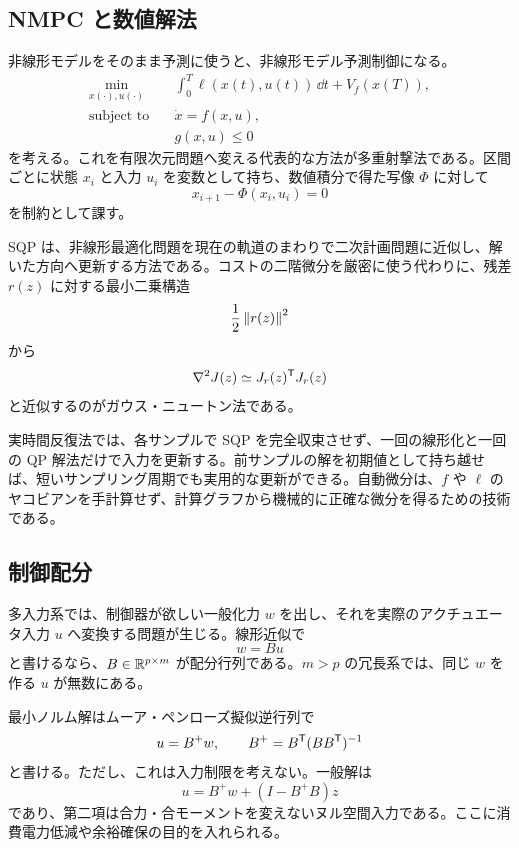 \subsection{NMPC と数値解法}

非線形モデルをそのまま予測に使うと、非線形モデル予測制御になる。
\begin{align}
  \min_{x(\cdot),u(\cdot)}\quad &
  \int_0^T \ell(x(t),u(t))\,\dd t+V_f(x(T)),\\
  \text{subject to}\quad &\dot{x}=f(x,u),\\
  &g(x,u)\le0
\end{align}
を考える。これを有限次元問題へ変える代表的な方法が多重射撃法である。区間ごとに状態 $x_i$ と入力 $u_i$ を変数として持ち、数値積分で得た写像 $\Phi$ に対して
\begin{equation}
  x_{i+1}-\Phi(x_i,u_i)=0
\end{equation}
を制約として課す。

SQP は、非線形最適化問題を現在の軌道のまわりで二次計画問題に近似し、解いた方向へ更新する方法である。コストの二階微分を厳密に使う代わりに、残差 $r(z)$ に対する最小二乗構造
\begin{equation}
  \frac{1}{2}\left\|r(z)\right\|^2
\end{equation}
から
\begin{equation}
  \nabla^2 J(z)\simeq J_r(z)^{\mathsf{T}} J_r(z)
\end{equation}
と近似するのがガウス・ニュートン法である。

実時間反復法では、各サンプルで SQP を完全収束させず、一回の線形化と一回の QP 解法だけで入力を更新する。前サンプルの解を初期値として持ち越せば、短いサンプリング周期でも実用的な更新ができる。自動微分は、$f$ や $\ell$ のヤコビアンを手計算せず、計算グラフから機械的に正確な微分を得るための技術である。

\subsection{制御配分}

多入力系では、制御器が欲しい一般化力 $w$ を出し、それを実際のアクチュエータ入力 $u$ へ変換する問題が生じる。線形近似で
\begin{equation}
  w=Bu
\end{equation}
と書けるなら、$B\in\mathbb{R}^{p\times m}$ が配分行列である。$m>p$ の冗長系では、同じ $w$ を作る $u$ が無数にある。

最小ノルム解はムーア・ペンローズ擬似逆行列で
\begin{equation}
  u=B^+w,
  \qquad
  B^+=B^{\mathsf{T}}(BB^{\mathsf{T}})^{-1}
\end{equation}
と書ける。ただし、これは入力制限を考えない。一般解は
\begin{equation}
  u=B^+w+(I-B^+B)z
\end{equation}
であり、第二項は合力・合モーメントを変えないヌル空間入力である。ここに消費電力低減や余裕確保の目的を入れられる。

